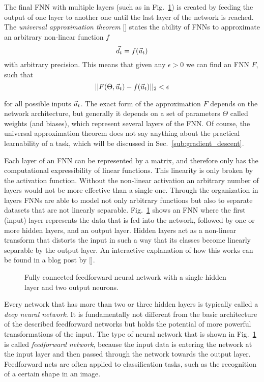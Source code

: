 The final FNN with multiple layers (such as in
Fig.~\ref{fig:feedforward_network}) is created by feeding the output of one
layer to another one until the last layer of the network is reached.  The
\emph{universal approximation theorem} [\cite{uni_approx_theorem}] states the
ability of FNNs to approximate an arbitrary non-linear function $f$
\begin{equation}
   \vec{d}_t = f(\vec{u}_t)
\end{equation}
with arbitrary precision. This means that given any $\epsilon > 0$ we can find
an FNN $F$, such that
\begin{equation}
  ||F(\Theta, \vec{u}_t) - f(\vec{u}_t)||_2 < \epsilon
\end{equation}

for all possible inputs $\vec{u}_t$. The exact form of the approximation $F$
depends on the network architecture, but generally it depends on a set of
parameters $\Theta$ called weights (and biases), which represent several layers
of the FNN.  Of course, the universal approximation theorem does not say
anything about the practical learnability of a task, which will be discussed in
Sec.~\ref{sub:gradient_descent}.

Each layer of an FNN can be represented by a matrix, and therefore only has the
computational expressibility of linear functions. This linearity is only broken
by the activation function. Without the non-linear activation an arbitrary
number of layers would not be more effective than a single one.  Through the
organization in layers FNNs are able to model not only arbitrary functions but
also to separate datasets that are not linearly separable.
Fig.~\ref{fig:feedforward_network} shows an FNN where the first (input) layer
represents the data that is fed into the network, followed by one or more
hidden layers, and an output layer.  Hidden layers act as a non-linear
transform that distorts the input in such a way that its classes become
linearly separable by the output layer.  An interactive explanation of how this
works can be found in a blog post by [\cite{colah_topology}].

\begin{figure}
  \centering
  \caption{Fully connected feedforward neural network with a single hidden
    layer and two output neurons.}
  \label{fig:feedforward_network}
\end{figure}

Every network that has more than two or three hidden layers is typically called
a \emph{deep neural network}. It is fundamentally not different from the basic
architecture of the described feedforward networks but holds the potential of
more powerful transformations of the input. The type of neural network that is
shown in Fig.~\ref{fig:feedforward_network} is called \emph{feedforward
network}, because the input data is entering the network at the input layer and
then passed through the network towards the output layer.  Feedforward nets are
often applied to classification tasks, such as the recognition of a certain
shape in an image.

